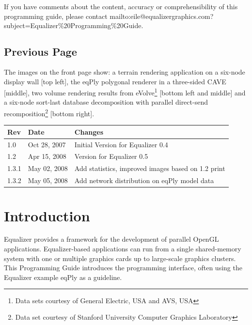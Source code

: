 \documentclass[10pt,a4]{scrartcl}
\begin{document}
If you have comments about the content, accuracy or comprehensibility of
this programming guide, please contact
{mailto:eile@equalizergraphics.com?subject=Equalizer\%20Programming\%20Guide}.

\vfill

\subsection*{Previous Page}

The images on the front page show: a terrain rendering application on a
six-node display wall [top left], the \textsf{eqPly} polygonal renderer
in a three-sided CAVE [middle], two volume rendering results from
eVolve\footnote{Data sets courtesy of General Electric, USA and AVS,
  USA} [bottom left and middle] and a six-node sort-last database
decomposition with parallel direct-send recomposition\footnote{Data set
  courtesy of Stanford University Computer Graphics Laboratory} [bottom
right].

\clearpage
\thispagestyle{empty}
\tableofcontents
\vfill{\center\begin{tabularx}{\textwidth}{|l|l|X|}
    \hline
    \bf Rev & \bf Date     & \bf Changes \\
    \hline
    1.0     & Oct 28, 2007 & Initial Version for Equalizer 0.4\\
    1.2     & Apr 15, 2008 & Version for Equalizer 0.5\\
    1.3.1   & May 02, 2008 & Add statistics, improved images based on 1.2 print\\
    1.3.2   & May 05, 2008 & Add network distribution on eqPly model data\\
    \hline
  \end{tabularx}}
\thispagestyle{empty}
\clearpage


\section{Introduction}

Equalizer provides a framework for the development of parallel OpenGL
applications. Equalizer-based applications can run from a single
shared-memory system with one or multiple graphics cards up to
large-scale graphics clusters. This Programming Guide introduces the
programming interface, often using the Equalizer example \textsf{eqPly}
as a guideline.
\end{document}
